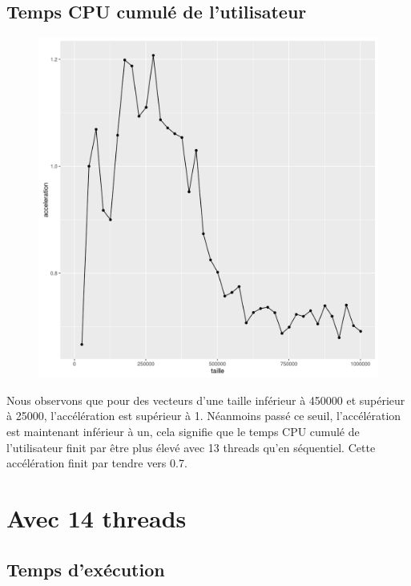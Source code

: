 \documentclass[a4paper,11pt]{scrartcl}
\begin{document}
\subsection{Temps CPU cumul\'e de l'utilisateur}
\begin{figure}[H] \center
   \includegraphics[scale=0.5] {graphes/temps_user_accel13.png}
\end{figure}
Nous observons que pour des vecteurs d'une taille inf\'erieur \`a 450000 et sup\'erieur \`a 25000, l'acc\'el\'eration est sup\'erieur \`a 1. N\'eanmoins pass\'e ce seuil,  l'acc\'el\'eration est maintenant inf\'erieur \`a un, cela signifie que le temps CPU cumul\'e de l'utilisateur finit par \^{e}tre plus \'elev\'e avec 13 threads qu'en s\'equentiel. Cette acc\'el\'eration finit par tendre vers 0.7.


\section{Avec 14 threads}
\subsection{Temps d'ex\'ecution}
\end{document}
